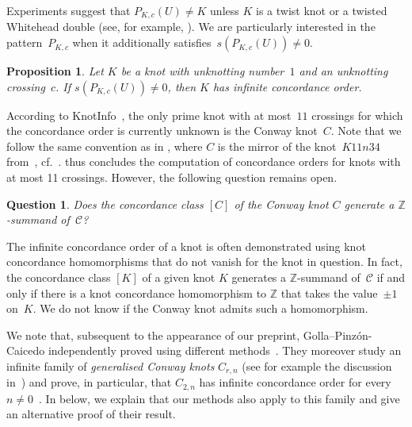 \documentclass{amsart}
\newtheorem{prop}[theorem]{Proposition}
\newtheorem{question}[theorem]{Question}
\theoremstyle{remark}
\begin{document}
Experiments suggest that $P_{K,c}(U) \neq K$ unless $K$ is a twist knot or a twisted Whitehead double (see, for example, \cite[Section~5]{KS_exotic_traces}). We are particularly interested in the pattern~$P_{K,c}$ when it additionally satisfies~$s(P_{K,c}(U))\neq 0$.

\begin{prop}\label{cor:inf_order}
    Let $K$ be a knot with unknotting number~$1$ and an 
    unknotting crossing~$c$. If $s(P_{K,c}(U))\neq 0$, then $K$ has infinite concordance order.
\end{prop}

According to KnotInfo~\cite{knotinfo}, the only prime knot with at most~$11$ crossings for which the concordance order is currently unknown is the Conway knot~$C$.
Note that we follow the same convention as in \cite{piccirillo:Conway}, where $C$ is the mirror of the knot~$K11n34$ from~\cite{Table}, cf.~\cite{DTnotation,knotinfo}.
 thus concludes the computation of concordance orders for knots with at most 11 crossings.
However, the following question remains open.

\begin{question}\label{question:Z-summand}
Does the concordance class $[C]$ of the Conway knot $C$
generate a $\mathbb{Z}$-summand of~$\mathcal{C}$?
\end{question}

The infinite concordance order of a knot is often demonstrated using knot concordance homomorphisms that do not vanish for the knot in question. In fact, the concordance class $[K]$ of a given knot $K$ generates a $\mathbb{Z}$-summand of~$\mathcal{C}$ if and only if there is a knot concordance homomorphism to $\mathbb{Z}$ that takes the value~$\pm 1$ on~$K$. We do not know if the Conway knot admits such a homomorphism.

We note that, subsequent to the appearance of our preprint, Golla--Pinzón-Caicedo independently proved  using different methods~\cite{golla_pinzon-caicedo}. They moreover study an infinite family of \emph{generalised Conway knots} $C_{r,n}$ (see for example the discussion in~\cite{Baldwin2025ConwayKnots}) and prove, in particular, that $C_{2,n}$ has infinite concordance order for every $n\neq 0$~\cite[Theorem~1.3]{golla_pinzon-caicedo}. In  below, we explain that our methods also apply to this family and give an alternative proof of their result. 
\end{document}
